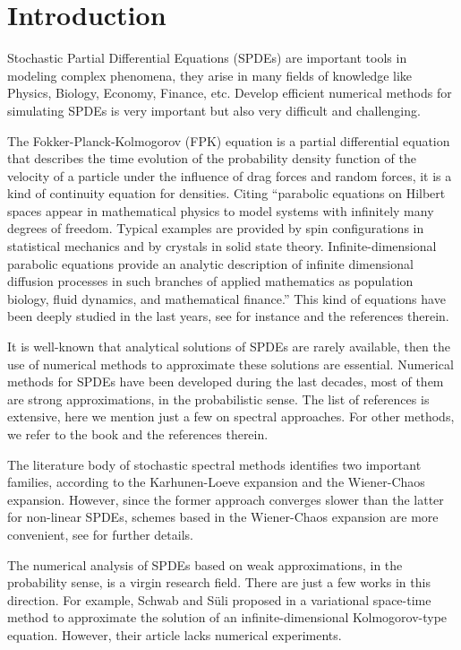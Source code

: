 \documentclass[]{interact}
\theoremstyle{plain}%
\theoremstyle{definition}
\theoremstyle{remark}
\begin{document}
\section{Introduction}
        Stochastic Partial Differential Equations (SPDEs) are important tools in
    modeling complex phenomena, they arise in many fields of knowledge like
    Physics, Biology, Economy, Finance, etc. Develop efficient numerical
    methods for simulating SPDEs is very important but also very difficult and
    challenging.
    
        The  Fokker-Planck-Kolmogorov (FPK) equation is a partial differential
    equation that describes the time evolution of the probability density 
    function of the velocity of a particle under the influence of drag forces 
    and random forces, it is a kind of continuity equation for densities. 
    Citing \cite{da-za}
    ``parabolic equations on Hilbert spaces appear in mathematical physics to 
    model systems with infinitely many degrees of freedom. Typical examples are 
    provided by spin configurations in statistical mechanics and by crystals in 
    solid state theory. Infinite-dimensional parabolic equations provide an 
    analytic description of infinite dimensional diffusion processes in such 
    branches of applied mathematics as population biology, fluid dynamics, and 
    mathematical finance.'' This kind of equations have been deeply studied in 
    the last years, see for instance \cite{bo-da-ro, da-fl-ro, da} and the 
    references therein.
    
        It is well-known that analytical solutions of SPDEs are rarely 
     available, then the use of numerical methods to approximate these solutions
     are essential. Numerical methods for SPDEs have been developed during the
     last decades, most of them are strong approximations, in the probabilistic
     sense. The list of references is extensive, here we mention just a few on
     spectral approaches. For other methods, we refer to the book
     \cite{milstein2013stochastic} and the references therein.
 
        The literature body of stochastic spectral methods identifies two 
     important families, according to the Karhunen-Loeve expansion and the  
     Wiener-Chaos expansion. However, since the former approach converges 
     slower than the latter for non-linear SPDEs, schemes based in the 
     Wiener-Chaos expansion are more convenient, see \cite{zhang2017numerical} 
     for further details.

       The numerical analysis of SPDEs based on weak approximations, in the 
     probability sense, is a virgin research field.  There are just a few works 
     in this direction.  For example, Schwab and S\"{u}li proposed in 
    \cite{schwab2013adaptive}  a variational space-time method to approximate 
    the solution of an infinite-dimensional Kolmogorov-type equation.  However, 
    their article lacks numerical experiments. 
    
\end{document}
